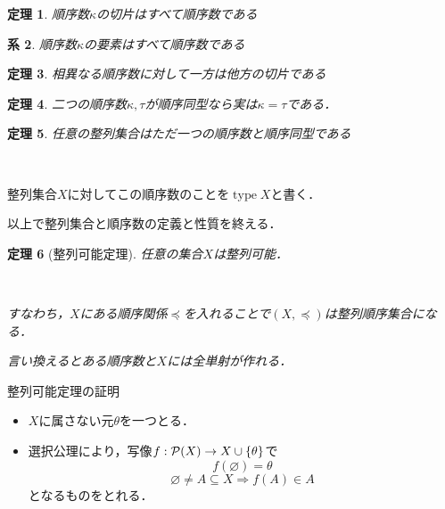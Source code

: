 \documentclass[dvipdfmx,17pt]{beamer}
\renewcommand{\subset}{\subseteq}
\renewcommand{\emptyset}{\varnothing}
\theoremstyle{plain}
\newtheorem{thm}{定理}
\newtheorem{cor}[thm]{系}
\DeclareMathOperator{\Type}{type}
\begin{document}
\begin{frame}
\begin{thm}
順序数$\kappa$の切片はすべて順序数である
\end{thm}

\begin{cor}
順序数$\kappa$の要素はすべて順序数である
\end{cor}
\end{frame}

\begin{frame}
\begin{thm}
相異なる順序数に対して一方は他方の切片である
\end{thm}
\end{frame}

\begin{frame}
\begin{thm}
二つの順序数$\kappa, \tau$が順序同型なら実は$\kappa = \tau$である．
\end{thm}
\end{frame}

\begin{frame}
\begin{thm}
任意の整列集合はただ一つの順序数と順序同型である
\end{thm}
\par　\par
整列集合$X$に対してこの順序数のことを$\Type X$と書く．
\end{frame}

\begin{frame}
以上で整列集合と順序数の定義と性質を終える．
\end{frame}

\begin{frame}
\begin{thm}[整列可能定理]
任意の集合$X$は整列可能．
\par　\par
すなわち，$X$にある順序関係$\preceq$を入れることで$(X, \preceq)$は整列順序集合になる．

言い換えるとある順序数と$X$には全単射が作れる．
\end{thm}
\end{frame}

\begin{frame}{整列可能定理の証明}
\begin{itemize}
\item $X$に属さない元$\theta$を一つとる．
\item 選択公理により，写像$f: {\cal P}(X) \to X \cup \{\theta\}$で
\[f(\emptyset) = \theta\]
\[\emptyset \ne A \subset X \Rightarrow f(A) \in A\]
となるものをとれる．
\end{itemize}
\end{frame}
\end{document}
